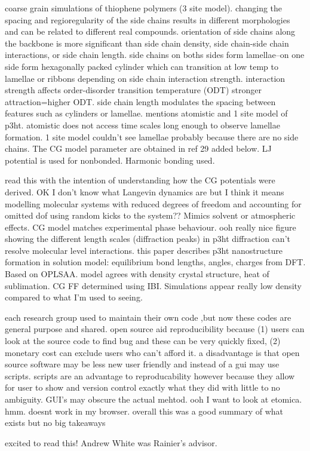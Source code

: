 \documentclass{article}
\begin{document}
\cite{Marsh2014}
coarse grain simulations of thiophene polymers (3 site model). changing the spacing and regioregularity of the side chains results in different morphologies and can be related to different real compounds.
orientation of side chains along the backbone is more significant than side chain density, side chain-side chain interactions, or side chain length. side chains on boths sides form lamellae--on one side form hexagonally packed cylinder which can transition at low temp to lamellae or ribbons depending on side chain interaction strength. interaction strength affects order-disorder transition temperature (ODT) stronger attraction=higher ODT. side chain length modulates the spacing between features such as cylinders or lamellae.
mentions atomistic and 1 site model of p3ht. atomistic does not access time scales long enough to observe lamellae formation. 1 site model couldn't see lamellae probably because there are no side chains.
The CG model parameter are obtained in ref 29 added below. LJ potential is used for nonbonded. Harmonic bonding used.

\cite{Schwarz2013}
read this with the intention of understanding how the CG potentials were derived.
OK I don't know what Langevin dynamics are but I think it means modelling molecular systems with reduced degrees of freedom and accounting for omitted dof using random kicks to the system?? Mimics solvent or atmospheric effects.
CG model matches experimental phase behaviour. 
ooh really nice figure showing the different length scales (diffraction peaks) in p3ht
diffraction can't resolve molecular level interactions.
this paper describes p3ht nanostructure formation in solution
model: equilibrium bond lengths, angles, charges from DFT. Based on OPLSAA. model agrees with density crystal structure, heat of sublimation. CG FF determined using IBI.
Simulations appear really low density compared to what I'm used to seeing.

\cite{Cummings2019}
each research group used to maintain their own code ,but now these codes are general purpose and shared. open source aid reproducibility because (1) users can look at the source code to find bug and these can be very quickly fixed, (2) monetary cost can exclude users who can't afford it.
a disadvantage is that open source software may be less new user friendly and instead of a gui may use scripts. scripts are an advantage to reproducability however because they allow for user to show and version control exactly what they did with little to no ambiguity. GUI's may obscure the actual mehtod.
ooh I want to look at etomica. hmm. doesnt work in my browser.
overall this was a good summary of what exists but no big takeaways

\cite{li2020}
excited to read this! Andrew White was Rainier's advisor.



\end{document}
